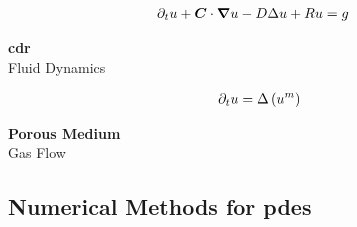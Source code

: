 \begin{frame}
\begin{multicols}{3}
        \begin{center}
            \begin{align*}
                \partial_t u + \bm{C} \cdot \bm{\nabla} u - D \Delta u + R u &= g
            \end{align*}

            \vspace*{0.125cm}
            {\large \textbf{\acrshort{cdr}}} \\
            Fluid Dynamics
        \end{center}

        \begin{center}
            \begin{align*}
                \partial_t u = \Delta \left( u^m \right)
            \end{align*}
            
            \vspace*{0.125cm}
            {\large \textbf{Porous Medium}} \\
            Gas Flow
        \end{center}

    \end{multicols}
    \vspace*{\fill}
    
\end{frame}

\subsection{Numerical Methods for \texorpdfstring{\acrlong{pdes}}{}}

